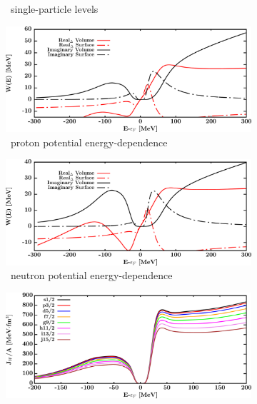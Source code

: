\begin{figure}[hbtp]
\begin{subfigure}[b]{0.45\textwidth}
        \caption{\snTwelve\ single-particle levels}
        \label{DOMFitData_sn112_SPLevels}
    \end{subfigure}\vspace{0.3in}
    \begin{subfigure}[b]{0.45\textwidth}
        \centering
        \includegraphics[width=\linewidth]{figures/sn112_protonPotentials.png}
        \caption{\snTwelve\ proton potential energy-dependence}
        \label{DOMFitData_sn112_proton_potentialComponent_energy}
    \end{subfigure}\hspace{6pt}
    \begin{subfigure}[b]{0.45\linewidth}
        \centering
        \includegraphics[width=\linewidth]{figures/sn112_neutronPotentials.png}
        \caption{\snTwelve\ neutron potential energy-dependence}
        \label{DOMFitData_sn112_neutron_potentialComponent_energy}
    \end{subfigure}\vspace{0.3in}
    \begin{subfigure}[b]{0.45\textwidth}
        \centering
        \includegraphics[width=\linewidth]{figures/sn112_protonVolumeIntegrals.png}

\end{subfigure}
\end{figure}
